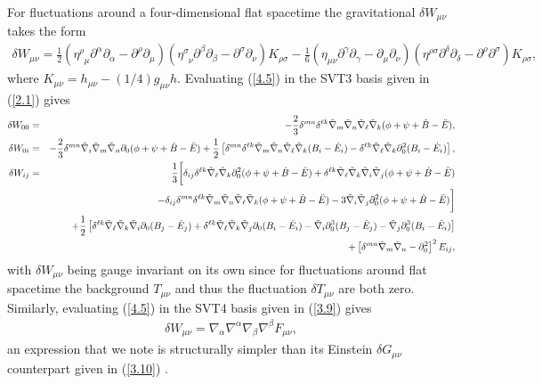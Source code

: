 \documentclass[aps,onecolumn,10pt]{revtex4}
\numberwithin{equation}{section}
\numberwithin{equation}{section}
\begin{document}
For fluctuations around a four-dimensional flat spacetime the gravitational $\delta W_{\mu\nu}$  takes the form \cite{Mannheim2006}
%
\begin{eqnarray}
\delta W_{\mu\nu}=\frac{1}{2}(\eta^{\rho}_{\phantom{\rho} \mu} \partial^{\alpha}\partial_{\alpha}-\partial^{\rho}\partial_{\mu})
(\eta^{\sigma}_{\phantom{\sigma} \nu} \partial^{\beta}\partial_{\beta}-
\partial^{\sigma}\partial_{\nu})K_{\rho \sigma}- 
\frac{1}{6}(\eta_{\mu \nu} \partial^{\gamma}\partial_{\gamma}-
\partial_{\mu}\partial_{\nu})(\eta^{\rho \sigma} \partial^{\delta}\partial_{\delta}-
\partial^{\rho}\partial^{\sigma})K_{\rho\sigma},
\label{4.5}
\end{eqnarray}
%
where $K_{\mu\nu}=h_{\mu\nu}-(1/4)g_{\mu\nu}h$. Evaluating (\ref{4.5}) in the SVT3 basis given in (\ref{2.1}) gives \cite{Amarasinghe2018}
%
\begin{eqnarray}
\delta W_{00}  &=& -\frac{2}{3} \delta^{mn}\delta^{\ell k}\tilde{\nabla}_m\tilde{\nabla}_n\tilde{\nabla}_{\ell}\tilde{\nabla}_k (\phi + \psi +\dot{B}-\ddot{E}),
\nonumber\\	
\delta W_{0i} &=&  -\frac{2}{3} \delta^{mn}\tilde{\nabla}_i\tilde{\nabla}_m\tilde{\nabla}_n\partial_0(\phi +\psi +\dot{B}-\ddot{E})
	+\frac{1}{2}\left[\delta^{mn}\delta^{\ell k}\tilde{\nabla}_m\tilde{\nabla}_n\tilde{\nabla}_{\ell}\tilde{\nabla}_k(B_i - \dot{E}_i) -  \delta^{\ell k}\tilde{\nabla}_{\ell}\tilde{\nabla}_k \partial_0^2(B_i - \dot{E}_i)\right],
\nonumber\\	
\delta W_{ij}  &=& \frac{1}{3}\bigg{[} \delta_{ij}\delta^{\ell k}\tilde{\nabla}_{\ell}\tilde{\nabla}_k  \partial_0^2(\phi+ \psi+\dot{B}-\ddot{E}) + \delta^{\ell k}\tilde{\nabla}_{\ell}\tilde{\nabla}_k \tilde{\nabla}_i\tilde{\nabla}_j (\phi + \psi +\dot{B}-\ddot{E}) 
\nonumber\\
&&- \delta_{ij} \delta^{mn}\delta^{\ell k}\tilde{\nabla}_m\tilde{\nabla}_n\tilde{\nabla}_{\ell}\tilde{\nabla}_k(\phi + \psi +\dot{B}-\ddot{E}) -3\tilde{\nabla}_i\tilde{\nabla}_j \partial_0^2(\phi + \psi +\dot{B}-\ddot{E})\bigg{] }
\nonumber\\
&&+\frac{1}{2}\left[ \delta^{\ell k}\tilde{\nabla}_{\ell}\tilde{\nabla}_k \tilde{\nabla}_i   \partial_0(B_j - \dot{E}_j)+ \delta^{\ell k}\tilde{\nabla}_{\ell}\tilde{\nabla}_k \tilde{\nabla}_j \partial_0(B_i - \dot{E}_i) - \tilde{\nabla}_i\partial_0^3(B_j - \dot{E}_j)-\tilde{\nabla}_j\partial_0^3(B_i - \dot{E}_i)\right]
\nonumber\\
&&+\left[\delta^{mn}\tilde{\nabla}_m\tilde{\nabla}_n-\partial_0^2\right]^2E_{ij},
\label{4.6}
\end{eqnarray}
%
with $\delta W_{\mu\nu}$ being gauge invariant on its own since for fluctuations around flat spacetime the background $T_{\mu\nu}$ and thus the fluctuation $\delta T_{\mu\nu}$ are both zero. Similarly,  evaluating (\ref{4.5}) in the SVT4 basis given in (\ref{3.9}) gives 
%
\begin{eqnarray}
\delta W_{\mu\nu}=\nabla_{\alpha}\nabla^{\alpha}\nabla_{\beta}\nabla^{\beta}F_{\mu\nu},
\label{4.7}
\end{eqnarray}
%
an expression that we note is structurally  simpler than its Einstein $\delta G_{\mu\nu}$ counterpart given  in (\ref{3.10}) \cite{footnote6}. 
\end{document}
